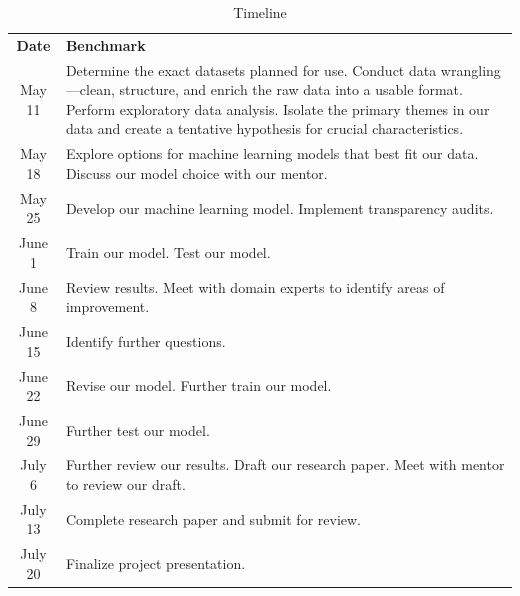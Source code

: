 \documentclass[journal]{IEEEtran}
\begin{document}
    \begin{table}[!t]
        \renewcommand{\arraystretch}{1.3}
        \caption{Timeline}
        \label{timeline}
        \centering
        \begin{tabular}{c|p{6cm}}
            \textbf{Date} & \textbf{Benchmark}                             \\
            May 11 & Determine the exact datasets planned for use.
            \newline Conduct data wrangling—clean, structure, and enrich the raw data into a usable format.
            \newline Perform exploratory data analysis.
            \newline Isolate the primary themes in our data and create a tentative hypothesis for crucial characteristics. \\
            May 18 & Explore options for machine learning models that best fit our data.
            \newline Discuss our model choice with our mentor. \\
            May 25 & Develop our machine learning model.
            \newline Implement transparency audits. \\
            June 1 & Train our model.
            \newline Test our model. \\
            June 8 & Review results.
            \newline Meet with domain experts to identify areas of improvement. \\
            June 15       & Identify further questions.                    \\
            June 22 & Revise our model.
            \newline Further train our model. \\
            June 29       & Further test our model.                        \\
            July 6 & Further review our results.
            \newline Draft our research paper.
            \newline Meet with mentor to review our draft. \\
            July 13       & Complete research paper and submit for review. \\
            July 20       & Finalize project presentation.                 \\
        \end{tabular}
    \end{table}
\end{document}
